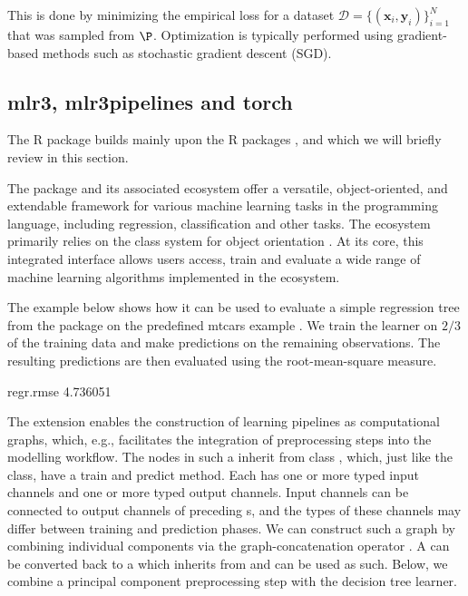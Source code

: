 \documentclass[article]{jss}
\theoremstyle{definition}
\begin{document}
This is done by minimizing the empirical loss for a dataset $\mathcal{D} = \{ (\mathbf{x}_i, \mathbf{y}_i) \}_{i=1}^N$ that was sampled from $\P$.
Optimization is typically performed using gradient-based methods such as stochastic gradient descent (SGD).

\subsection{mlr3, mlr3pipelines and torch}

The  R package builds mainly upon the R packages  \citep{ref-mlr32019},  \citep{ref-mlr3pipelines2021} and  \citep{ref-torch2025} which we will briefly review in this section.

The  package and its associated ecosystem offer a versatile, object-oriented, and extendable framework for various machine learning tasks in the  programming language, including regression, classification and other tasks.
The ecosystem primarily relies on the  class system for object orientation \citep{ref-r6chang}.
At its core, this integrated interface allows users access, train and evaluate a wide range of machine learning algorithms implemented in the  ecosystem.

The example below shows how it can be used to evaluate a simple regression tree  from the  package \citep{ref-rpart2025} on the predefined mtcars example .
We train the learner on $2/3$ of the training data and make predictions on the remaining observations.
The resulting predictions are then evaluated using the root-mean-square measure.

\begin{CodeOutput}
regr.rmse
 4.736051
\end{CodeOutput}


The  extension enables the construction of learning pipelines as computational graphs, which, e.g., facilitates the integration of preprocessing steps into the modelling workflow.
The nodes in such a  inherit from class , which, just like the  class, have a train and predict method.
Each  has one or more typed input channels and one or more typed output channels. Input channels can be connected to output channels of preceding s, and the types of these channels may differ between training and prediction phases.
We can construct such a graph by combining individual components via the graph-concatenation operator \code{\%>>\%}.
A  can be converted back to a  which inherits from  and can be used as such.
Below, we combine a principal component preprocessing step with the decision tree learner.
\end{document}
